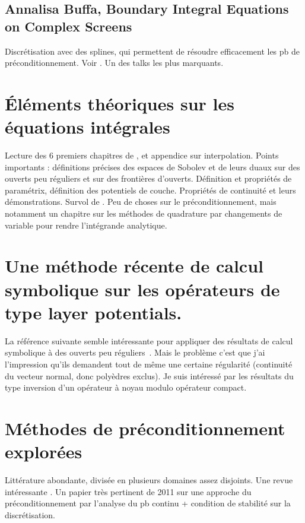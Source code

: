\documentclass[11pt,a4paper]{article}
\begin{document}
\subsection{Annalisa Buffa, Boundary Integral Equations on Complex Screens} 

Discrétisation avec des splines, qui permettent de résoudre efficacement les pb de préconditionnement. Voir \cite{da2014mathematical}. Un des talks les plus marquants. 

\section{Éléments théoriques sur les équations intégrales}

Lecture des 6 premiers chapitres de \cite{mclean2000strongly}, et appendice sur interpolation. Points importants : définitions précises des espaces de Sobolev et de leurs duaux sur des ouverts peu réguliers et sur des frontières d'ouverts. Définition et propriétés de paramétrix, définition des potentiels de couche. Propriétés de continuité et leurs démonstrations. 
Survol de \cite{sauter2011boundary}. Peu de choses sur le préconditionnement, mais notamment un chapitre sur les méthodes de quadrature par changements  de variable pour rendre l'intégrande analytique. 

\section{Une méthode récente de calcul symbolique sur les opérateurs de type layer potentials.}

La référence suivante semble intéressante pour appliquer des résultats de calcul symbolique à des ouverts peu réguliers~\cite{hofmann2015symbol}. Mais le problème c'est que j'ai l'impression qu'ils demandent tout de même une certaine régularité (continuité du vecteur normal, donc polyèdres exclus). Je suis intéressé par les résultats du type inversion d'un opérateur à noyau modulo opérateur compact. 

\section{Méthodes de préconditionnement explorées}

Littérature abondante, divisée en plusieurs domaines assez disjoints. Une revue intéressante \cite{benzi2002preconditioning}. Un papier très pertinent \cite{mardal2011preconditioning}  de 2011 sur une approche du préconditionnement par l'analyse du pb continu + condition de stabilité sur la discrétisation.
\end{document}
